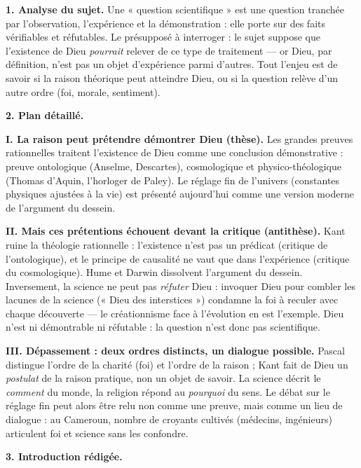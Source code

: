 \documentclass[11pt]{article}
\begin{document}
\begin{corrige}

\textbf{1. Analyse du sujet.} Une « question scientifique » est une question tranchée par l'observation, l'expérience et la démonstration : elle porte sur des faits vérifiables et réfutables. Le présupposé à interroger : le sujet suppose que l'existence de Dieu \emph{pourrait} relever de ce type de traitement — or Dieu, par définition, n'est pas un objet d'expérience parmi d'autres. Tout l'enjeu est de savoir si la raison théorique peut atteindre Dieu, ou si la question relève d'un autre ordre (foi, morale, sentiment).

\textbf{2. Plan détaillé.}

\textbf{I. La raison peut prétendre démontrer Dieu (thèse).} Les grandes preuves rationnelles traitent l'existence de Dieu comme une conclusion démonstrative : preuve ontologique (Anselme, Descartes), cosmologique et physico-théologique (Thomas d'Aquin, l'horloger de Paley). Le réglage fin de l'univers (constantes physiques ajustées à la vie) est présenté aujourd'hui comme une version moderne de l'argument du dessein.

\textbf{II. Mais ces prétentions échouent devant la critique (antithèse).} Kant ruine la théologie rationnelle : l'existence n'est pas un prédicat (critique de l'ontologique), et le principe de causalité ne vaut que dans l'expérience (critique du cosmologique). Hume et Darwin dissolvent l'argument du dessein. Inversement, la science ne peut pas \emph{réfuter} Dieu : invoquer Dieu pour combler les lacunes de la science (« Dieu des interstices ») condamne la foi à reculer avec chaque découverte — le créationnisme face à l'évolution en est l'exemple. Dieu n'est ni démontrable ni réfutable : la question n'est donc pas scientifique.

\textbf{III. Dépassement : deux ordres distincts, un dialogue possible.} Pascal distingue l'ordre de la charité (foi) et l'ordre de la raison ; Kant fait de Dieu un \emph{postulat} de la raison pratique, non un objet de savoir. La science décrit le \emph{comment} du monde, la religion répond au \emph{pourquoi} du sens. Le débat sur le réglage fin peut alors être relu non comme une preuve, mais comme un lieu de dialogue : au Cameroun, nombre de croyants cultivés (médecins, ingénieurs) articulent foi et science sans les confondre.

\textbf{3. Introduction rédigée.}


\end{corrige}
\end{document}
